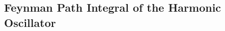 % 


% 

% 
% 
% 


% 
% 

\newpage
\setcounter{section}{4}
\setcounter{subsection}{0}
\subsection{Feynman Path Integral of the Harmonic Oscillator}




